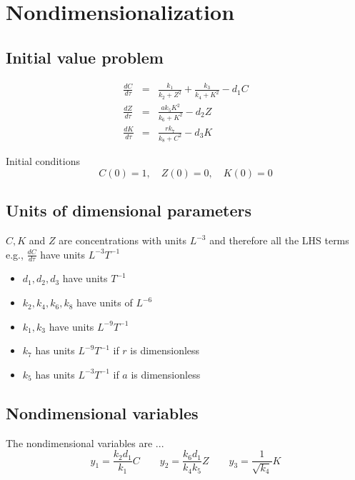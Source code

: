 \documentclass[10pt,letterpaper]{article}
\begin{document}

\section{Nondimensionalization}

\subsection{Initial value problem}

\begin{eqnarray}
\frac{dC}{d\tau} &=& \frac{k_1}{k_2 + Z^2} + \frac{k_3}{k_4 + K^2} - d_1 C  \label{eq:de_one} \\
\frac{dZ}{d\tau} &=& \frac{a k_5 K^2}{k_6 + K^2} - d_2 Z \label{eq:de_two} \\
\frac{dK}{d\tau} &=& \frac{r k_7}{k_8 + C^2} - d_3 K \label{eq:de_three} 
\end{eqnarray}

Initial conditions
\begin{equation}
C(0) = 1, \quad Z(0) = 0, \quad K(0) = 0
\end{equation}



\subsection{Units of dimensional parameters}

$C, K$ and $Z$ are concentrations with units $L^{-3}$ and therefore all the LHS terms e.g., $\frac{dC}{d\tau}$ have units $L^{-3}T^{-1}$

\begin{itemize}
  \item $d_1, d_2, d_3$ have units $T^{-1}$
  \item $k_2, k_4, k_6, k_8$ have units of $L^{-6}$ %
  \item $k_1, k_3$ have units $L^{-9} T^{-1}$
  \item $k_7$ has units $L^{-9} T^{-1}$ if $r$ is dimensionless
  \item $k_5$ has units $L^{-3}T^{-1}$  if $a$ is dimensionless
\end{itemize}


\subsection{Nondimensional variables}
The nondimensional variables are ...
\begin{equation}\label{eq:variables}
y_1 = \frac{k_2 d_1}{k_1} C \qquad
y_2 = \frac{k_6 d_1}{k_4 k_5} Z \qquad
y_3 = \frac{1}{\sqrt{k_4}} K 
\end{equation}
\end{document}
